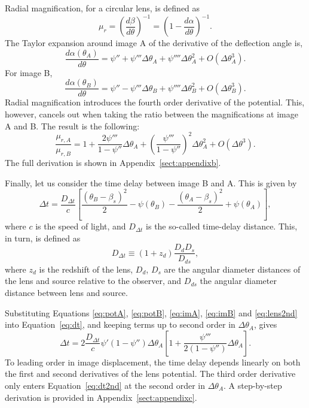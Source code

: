 \documentclass[usenatbib]{mnras}
\def\psii{\psi'}
\def\psiii{\psi''}
\def\psiiii{\psi'''}
\def\psiiv{\psi''''}
\def\Eref#1{Equation~\ref{#1}\xspace}
\begin{document}
Radial magnification, for a circular lens, is defined as
\begin{equation}\label{eq:murdef}
\mu_r = \left(\frac{d\beta}{d\theta}\right)^{-1} = \left(1 - \frac{d\alpha}{d\theta}\right)^{-1}.
\end{equation}
The Taylor expansion around image A of the derivative of the deflection angle is,
\begin{equation}\label{eq:dalphaa}
\frac{d\alpha(\theta_A)}{d\theta} = \psiii + \psiiii\Delta\theta_A + \psiiv\Delta\theta_A^2 + O(\Delta\theta_A^3).
\end{equation}
For image B,
\begin{equation}\label{eq:dalphab}
\frac{d\alpha(\theta_B)}{d\theta} = \psiii - \psiiii\Delta\theta_B + \psiiv\Delta\theta_B^2 + O(\Delta\theta_B^3).
\end{equation}
Radial magnification introduces the fourth order derivative of the potential. This, however, cancels out when taking the ratio between the magnifications at image A and B. The result is the following:
\begin{equation}\label{eq:radmagrat}
\frac{\mu_{r,A}}{\mu_{r,B}} = 1 + \frac{2\psiiii}{1-\psiii}\Delta\theta_A + \left(\frac{\psiiii}{1-\psiii}\right)^2\Delta\theta_A^2 + O(\Delta\theta^3).
\end{equation}
The full derivation is shown in Appendix~\ref{sect:appendixb}.

Finally, let us consider the time delay between image B and A. This is given by
\begin{equation}\label{eq:dt}
\Delta t = \frac{D_{\Delta t}}{c}\left[\frac{(\theta_B - \beta_s)^2}{2} - \psi(\theta_B) - \frac{(\theta_A - \beta_s)^2}{2} + \psi(\theta_A)\right],
\end{equation}
where $c$ is the speed of light, and $D_{\Delta t}$ is the so-called time-delay distance. This, in turn, is defined as
\begin{equation}
D_{\Delta t} \equiv (1+z_d) \frac{D_d D_s}{D_{ds}},
\end{equation}
where $z_d$ is the redshift of the lens, $D_d$, $D_s$ are the angular diameter distances of the lens and source relative to the observer, and $D_{ds}$ the angular diameter distance between lens and source. 

Substituting Equations \ref{eq:potA}, \ref{eq:potB}, \ref{eq:imA}, \ref{eq:imB} and \ref{eq:lens2nd} into \Eref{eq:dt}, and keeping terms up to second order in $\Delta\theta_A$, gives
\begin{equation}\label{eq:dt2nd}
\Delta t = 2\frac{D_{\Delta t}}{c}\psii(1 - \psiii)\Delta\theta_A\left[1 + \frac{\psiiii}{2(1 - \psiii)}\Delta\theta_A\right].
\end{equation}
%
To leading order in image displacement, the time delay depends linearly on both the first and second derivatives of the lens potential. The third order derivative only enters \Eref{eq:dt2nd} at the second order in $\Delta\theta_A$. A step-by-step derivation is provided in Appendix~\ref{sect:appendixc}.
\end{document}
